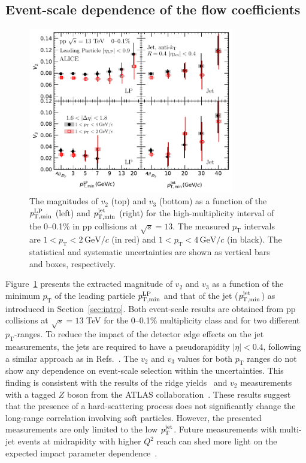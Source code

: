\subsection{Event-scale dependence of the flow coefficients}
\begin{figure}[h!]
	\centering
	\hspace{-3em}\includegraphics[width=0.8\textwidth]{figures/FIG6_vn_LP.pdf}
	\caption{The magnitudes of $v_2$ (top) and $v_3$ (bottom) as a function of the $\it{p}^{\rm{LP}}_{\rm{T,min}}$ (left) and $\it{p}^{\rm{jet}}_{\rm{T,min}}$ (right) for the high-multiplicity interval of the 0--0.1\% in pp collisions at $\sqrt{s}=13$. The measured $p_{\mathrm{T}}$ intervals are $1<p_{\mathrm{T}}<2\,\mathrm{GeV}/c$ (in red) and $1<p_{\mathrm{T}}<4\,\mathrm{GeV}/c$ (in black). The statistical and systematic uncertainties are shown as vertical bars and boxes, respectively.}
	\label{fig:LPjet23}
\end{figure}    

Figure~\ref{fig:LPjet23} presents the extracted magnitude of $v_2$ and $v_3$ as a function of the minimum $p_\mathrm{T}$ of the leading particle $\it{p}^{\rm{LP}}_{\rm{T,min}}$ and that of the jet ($\it{p}^{\rm{jet}}_{\rm{T,min}}$) as introduced in Section~\ref{sec:intro}. 
Both event-scale results are obtained from pp collisions at $\sqrt{s}= 13$ TeV for the 0--0.1\% multiplicity class and for two different $p_\mathrm{T}$-ranges.
To reduce the impact of the detector edge effects on the jet measurements, the jets are required to have a pseudorapidity $|\eta|<0.4$, following a similar approach as in Refs.~\cite{CDF:2001onq, ATLAS:2014riz, CMS:2015jdl}. The $v_2$ and $v_3$ values for both $p_\mathrm{T}$ ranges do not show any dependence on event-scale selection within the uncertainties. This finding is consistent with the results of the ridge yields~\cite{ALICE:2021nir} and $v_{2}$ measurements with a tagged $Z$ boson from the ATLAS collaboration~\cite{Aaboud:2019mcw}. These results suggest that the presence of a hard-scattering process does not significantly change the long-range correlation involving soft particles.
However, the presented measurements are only limited to the low $\it{p}^{\rm{jet}}_{\rm{T}}$. Future measurements with multi-jet events at midrapidity with higher $Q^2$ reach can shed more light on the expected impact parameter dependence~\cite{Sjostrand:1986ep,Frankfurt:2003td,Frankfurt:2010ea}.

